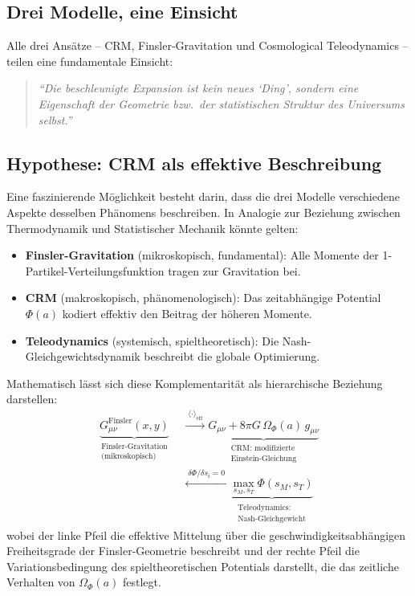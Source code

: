 \documentclass[aps,prd,twocolumn,superscriptaddress,nofootinbib]{revtex4-2}
\begin{document}
\subsection{Drei Modelle, eine Einsicht}

Alle drei Ans\"atze -- CRM, Finsler-Gravitation und Cosmological Teleodynamics -- teilen eine fundamentale Einsicht:
\begin{quote}
\textit{``Die beschleunigte Expansion ist kein neues `Ding', sondern eine Eigenschaft der Geometrie bzw.\ der statistischen Struktur des Universums selbst.''}
\end{quote}

\subsection{Hypothese: CRM als effektive Beschreibung}

Eine faszinierende M\"oglichkeit besteht darin, dass die drei Modelle verschiedene Aspekte desselben Ph\"anomens beschreiben. In Analogie zur Beziehung zwischen Thermodynamik und Statistischer Mechanik k\"onnte gelten:

\begin{itemize}
\item \textbf{Finsler-Gravitation} (mikroskopisch, fundamental): Alle Momente der 1-Partikel-Verteilungsfunktion tragen zur Gravitation bei.
\item \textbf{CRM} (makroskopisch, ph\"anomenologisch): Das zeitabh\"angige Potential $\Phi(a)$ kodiert effektiv den Beitrag der h\"oheren Momente.
\item \textbf{Teleodynamics} (systemisch, spieltheoretisch): Die Nash-Gleichgewichtsdynamik beschreibt die globale Optimierung.
\end{itemize}

Mathematisch l\"asst sich diese Komplementarit\"at als hierarchische Beziehung darstellen:
\begin{equation}
\begin{split}
\underbrace{G_{\mu\nu}^{\mathrm{Finsler}}(x, y)}_{\substack{\text{Finsler-Gravitation}\\\text{(mikroskopisch)}}}
&\;\xrightarrow{\;\langle\cdot\rangle_{\mathrm{eff}}\;}
\underbrace{G_{\mu\nu} + 8\pi G\,\Omega_\Phi(a)\,g_{\mu\nu}}_{\substack{\text{CRM: modifizierte}\\\text{Einstein-Gleichung}}} \\
&\;\xleftarrow{\;\delta\Phi/\delta s_i = 0\;}
\underbrace{\max_{s_M, s_T} \Phi(s_M, s_T)}_{\substack{\text{Teleodynamics:}\\\text{Nash-Gleichgewicht}}}
\end{split}
\label{eq:complementarity}
\end{equation}
wobei der linke Pfeil die effektive Mittelung \"uber die geschwindigkeitsabh\"angigen Freiheitsgrade der Finsler-Geometrie beschreibt und der rechte Pfeil die Variationsbedingung des spieltheoretischen Potentials darstellt, die das zeitliche Verhalten von $\Omega_\Phi(a)$ festlegt.
\end{document}
